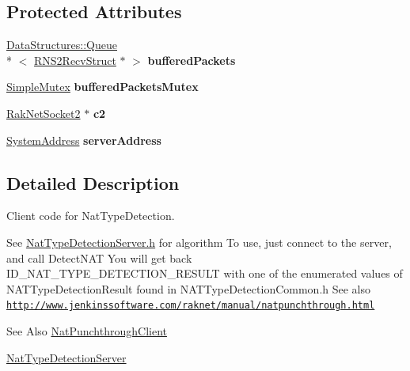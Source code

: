 \subsection*{Protected Attributes}
\begin{DoxyCompactItemize}
\item 
\hypertarget{class_rak_net_1_1_nat_type_detection_client_a2d07c83213ba9655c4fda7ad8f21928e}{\hyperlink{class_data_structures_1_1_queue}{Data\-Structures\-::\-Queue}\\*
$<$ \hyperlink{struct_rak_net_1_1_r_n_s2_recv_struct}{R\-N\-S2\-Recv\-Struct} $\ast$ $>$ {\bfseries buffered\-Packets}}\label{class_rak_net_1_1_nat_type_detection_client_a2d07c83213ba9655c4fda7ad8f21928e}

\item 
\hypertarget{class_rak_net_1_1_nat_type_detection_client_ac2f4c1d459f9488637244b80ea49a93e}{\hyperlink{class_rak_net_1_1_simple_mutex}{Simple\-Mutex} {\bfseries buffered\-Packets\-Mutex}}\label{class_rak_net_1_1_nat_type_detection_client_ac2f4c1d459f9488637244b80ea49a93e}

\item 
\hypertarget{class_rak_net_1_1_nat_type_detection_client_a43291e4a6bd02ab214bd54d767a2b333}{\hyperlink{class_rak_net_1_1_rak_net_socket2}{Rak\-Net\-Socket2} $\ast$ {\bfseries c2}}\label{class_rak_net_1_1_nat_type_detection_client_a43291e4a6bd02ab214bd54d767a2b333}

\item 
\hypertarget{class_rak_net_1_1_nat_type_detection_client_af3cdfe8e7e05147f8ea74723a3911ad3}{\hyperlink{struct_rak_net_1_1_system_address}{System\-Address} {\bfseries server\-Address}}\label{class_rak_net_1_1_nat_type_detection_client_af3cdfe8e7e05147f8ea74723a3911ad3}

\end{DoxyCompactItemize}


\subsection{Detailed Description}
Client code for Nat\-Type\-Detection. 

See \hyperlink{_nat_type_detection_server_8h}{Nat\-Type\-Detection\-Server.\-h} for algorithm To use, just connect to the server, and call Detect\-N\-A\-T You will get back I\-D\-\_\-\-N\-A\-T\-\_\-\-T\-Y\-P\-E\-\_\-\-D\-E\-T\-E\-C\-T\-I\-O\-N\-\_\-\-R\-E\-S\-U\-L\-T with one of the enumerated values of N\-A\-T\-Type\-Detection\-Result found in N\-A\-T\-Type\-Detection\-Common.\-h See also \href{http://www.jenkinssoftware.com/raknet/manual/natpunchthrough.html}{\tt http\-://www.\-jenkinssoftware.\-com/raknet/manual/natpunchthrough.\-html} \begin{DoxySeeAlso}{See Also}
\hyperlink{class_rak_net_1_1_nat_punchthrough_client}{Nat\-Punchthrough\-Client} 

\hyperlink{class_rak_net_1_1_nat_type_detection_server}{Nat\-Type\-Detection\-Server} 
\end{DoxySeeAlso}


